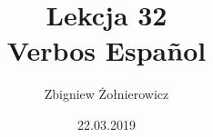 \documentclass[a4paper]{article}
\begin{document}
    \title{
        {\huge Lekcja 32} \\
        {\large Verbos Espa\~{n}ol}
    }
    \author{Zbigniew Żołnierowicz}
    \date{22.03.2019}
    \maketitle
\end{document}
